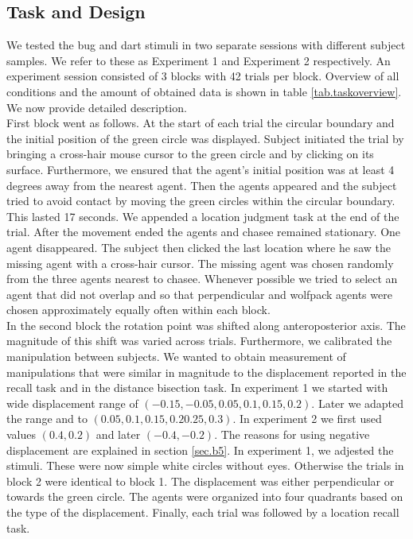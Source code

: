 \documentclass[10pt]{article}
\begin{document}
\subsection*{Task and Design}
We tested the bug and dart stimuli in two separate sessions with different subject samples. 
We refer to these as Experiment 1 and Experiment 2 respectively.
An experiment session consisted of 3 blocks with 42 trials per block. 
Overview of all conditions and the amount of obtained data is shown in table \ref{tab.taskoverview}. 
We now provide detailed description. \\
First block went as follows. 
At the start of each trial the circular boundary and the initial position of the green circle was displayed. 
Subject initiated the trial by bringing a cross-hair mouse cursor to the green circle and by clicking on its surface. 
Furthermore, we ensured that the agent's initial position was at least 4 degrees away from the nearest agent. 
Then the agents appeared and the subject tried to avoid contact by moving the green circles within the circular boundary. 
This lasted 17 seconds. 
We appended a location judgment task at the end of the trial. 
After the movement ended the agents and chasee remained stationary. 
One agent disappeared. 
The subject then clicked the last location where he saw the missing agent with a cross-hair cursor. 
The missing agent was chosen randomly from the three agents nearest to chasee. 
Whenever possible we tried to select an agent that did not overlap and so that perpendicular and wolfpack agents were chosen approximately equally often within each block. \\
In the second block the rotation point was shifted along anteroposterior axis. 
The magnitude of this shift was varied across trials. 
Furthermore, we calibrated the manipulation between subjects. 
We wanted to obtain measurement of manipulations that were similar in magnitude to the displacement reported in the recall task and in the distance bisection task. 
In experiment 1 we started with wide displacement range of $(-0.15, -0.05, 0.05, 0.1, 0.15, 0.2)$. 
Later we adapted the range and to $(0.05, 0.1,0.15, 0.2 0.25,0.3)$. 
In experiment 2 we first used values $(0.4, 0.2)$ and later $(-0.4, -0.2)$. 
The reasons for using negative displacement are explained in section \ref{sec.b5}. 
In experiment 1, we adjested the stimuli.
These were now simple white circles without eyes.
Otherwise the trials in block 2 were identical to block 1. 
The displacement was either perpendicular or towards the green circle. 
The agents were organized into four quadrants based on the type of the displacement. Finally, each trial was followed by a location recall task. 
\end{document}
